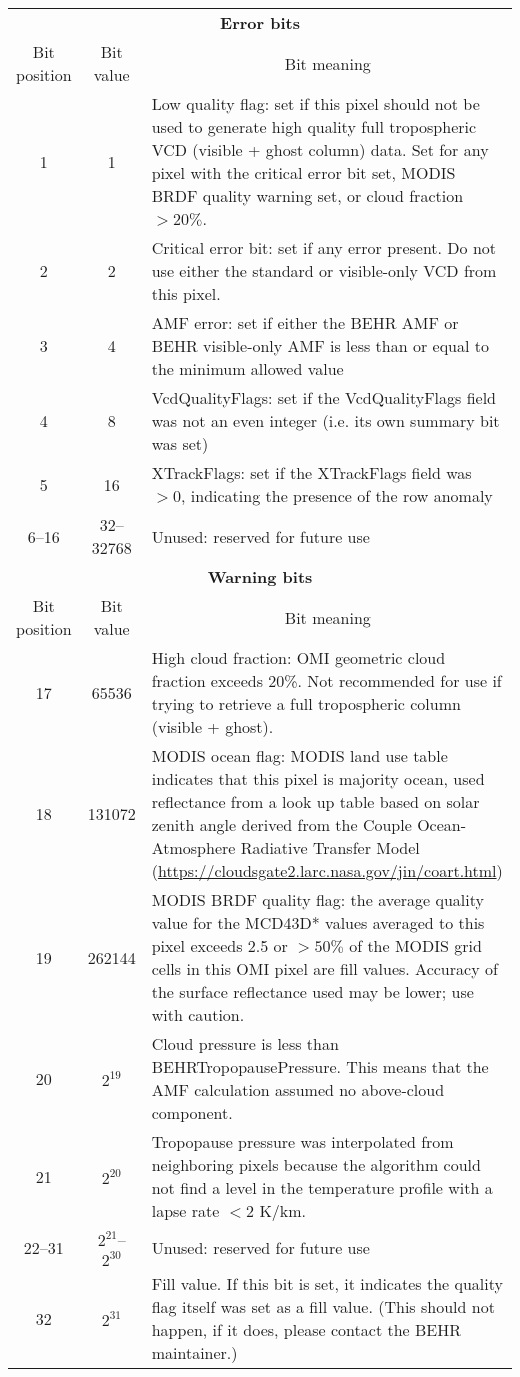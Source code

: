 \documentclass[12pt]{article}
\begin{document}
\begin{table}
\def\arraystretch{1.5}
\begin{tabularx}{\linewidth}{ccX}
\hline
\multicolumn{3}{c}{\textbf{Error bits}} \\
Bit position & Bit value & \multicolumn{1}{c}{Bit meaning} \\ \hline
1 & 1 & Low quality flag: set if this pixel should not be used to generate high quality full tropospheric VCD (visible + ghost column) data. Set for any pixel with the critical error bit set, MODIS BRDF quality warning set, or cloud fraction $> 20\%$.\\
2 & 2 & Critical error bit: set if any error present. Do not use either the standard or visible-only VCD from this pixel. \\
3 & 4 & AMF error: set if either the BEHR AMF or BEHR visible-only AMF is less than or equal to the minimum allowed value \\
4 & 8 & VcdQualityFlags: set if the VcdQualityFlags field was not an even integer (i.e. its own summary bit was set) \\
5 & 16 & XTrackFlags: set if the XTrackFlags field was $> 0$, indicating the presence of the row anomaly \\ 
6--16 & 32--32768 & Unused: reserved for future use \\ \hline
%
\multicolumn{3}{c}{\textbf{Warning bits}} \\
Bit position & Bit value & \multicolumn{1}{c}{Bit meaning} \\ \hline
17 & 65536 & High cloud fraction: OMI geometric cloud fraction exceeds 20\%. Not recommended for use if trying to retrieve a full tropospheric column (visible + ghost). \\
18 & 131072 & MODIS ocean flag: MODIS land use table indicates that this pixel is majority ocean, used reflectance from a look up table based on solar zenith angle derived from the Couple Ocean-Atmosphere Radiative Transfer Model (\url{https://cloudsgate2.larc.nasa.gov/jin/coart.html}) \\ 
19 & 262144 & MODIS BRDF quality flag: the average quality value for the MCD43D* values averaged to this pixel exceeds 2.5 or $>50\%$ of the MODIS grid cells in this OMI pixel are fill values. Accuracy of the surface reflectance used may be lower; use with caution. \\
20 & $2^{19}$ & Cloud pressure is less than BEHRTropopausePressure. This means that the AMF calculation assumed no above-cloud component. \\
21 & $2^{20}$ & Tropopause pressure was interpolated from neighboring pixels because the algorithm could not find a level in the temperature profile with a lapse rate $< 2$ K/km. \\
22--31 & $2^{21}$--$2^{30}$ & Unused: reserved for future use \\ 
32 & $2^{31}$ & Fill value. If this bit is set, it indicates the quality flag itself was set as a fill value. (This should not happen, if it does, please contact the BEHR maintainer.) \\ \hline



\end{tabularx}
\end{table}
\end{document}
